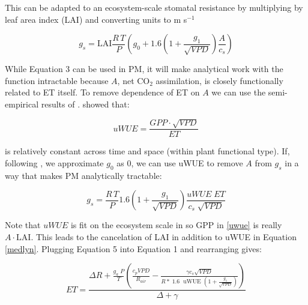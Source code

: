 \documentclass[draft,linenumbers]{agujournal}
\begin{document}
This can be adapted to an ecosystem-scale stomatal resistance by multiplying by leaf area index (LAI) and converting units to m s$^{-1}$

\begin{linenomath*}
  \label{medlyn}
  \begin{equation}
  g_s = \text{LAI} \frac{R \,T}{P} \left( g_0 + 1.6 \left(1 + \frac{g_1}{\sqrt{VPD}}\right) \frac{A}{c_s}\right)
  \end{equation}
\end{linenomath*}

While Equation 3 can be used in PM, it will make analytical work with the function intractable because $A$, net CO$_2$ assimilation, is closely functionally related to ET itself. To remove dependence of ET on $A$ we can use the semi-empirical results of \citet{Zhou_2015}. \citet{Zhou_2015} showed that:

\begin{linenomath*}
  \begin{equation}
    \label{uwue}
uWUE = \frac{GPP \cdot \sqrt{VPD}}{ET}
  \end{equation}
\end{linenomath*}
is relatively constant across time and space (within plant functional type). If, following \citet{Lin_2015}, we approximate $g_0$ as $0$, we can use uWUE to remove $A$ from $g_s$ in a way that makes PM analytically tractable:

\begin{linenomath*}
  \begin{equation}
  g_s = \frac{R \, T}{P} 1.6 \left(1 + \frac{g_1}{\sqrt{VPD}}\right) \frac{uWUE \; ET}{c_s \; \sqrt{VPD}}
  \end{equation}
\end{linenomath*}

Note that $uWUE$ is fit on the ecosystem scale in \citet{Zhou_2015} so GPP in \ref{uwue} is really $A\cdot \text{LAI}$. This leads to the cancelation of LAI in addition to uWUE in Equation \ref{medlyn}. Plugging Equation 5 into Equation 1 and rearranging gives:

\begin{linenomath*}
  \begin{equation}
    ET = \frac{\Delta R + \frac{g_a\; P}{T} \left( \frac{ c_p VPD}{R_{air}} -  \frac{\gamma c_s \sqrt{VPD} }{ R* \; 1.6\; \text{ uWUE } (1 + \frac{g_1}{\sqrt{VPD}})} \right) }{ \Delta + \gamma}
    \label{et}
  \end{equation}
\end{linenomath*}
\end{document}
